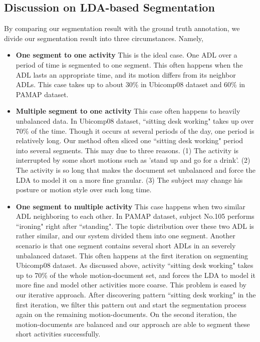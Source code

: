 \documentclass{sigchi}
\begin{document}
    \subsection{Discussion on LDA-based Segmentation}
    By comparing our segmentation result with the ground truth annotation, we divide our segmentation result into three circumstances. Namely,
    \begin{itemize}
        \item \textbf{One segment to one activity}
         This is the ideal case.
         One ADL over a period of time is segmented to one segment.
         This often happens when the ADL lasts an appropriate time, and its motion differs from its neighbor ADLs.
         This case takes up to about 30\% in Ubicomp08 dataset and 60\% in PAMAP dataset.
        \item \textbf{Multiple segment to one activity}
        This case often happens to heavily unbalanced data.
        In Ubicomp08 dataset, ``sitting desk working" takes up over 70\% of the time. Though it occurs at several periods of the day, one period is relatively long. 
        Our method often sliced one ``sitting desk working" period into several segments.
        This may due to three reasons.
        (1) The activity is interrupted by some short motions such as 'stand up and go for a drink'.
        (2) The activity is so long that makes the document set unbalanced and force the LDA to model it on a more fine granular.
        (3) The subject may change his posture or motion style over such long time.
        \item \textbf{One segment to multiple activity}
        This case happens when two similar ADL neighboring to each other.
        In PAMAP dataset, subject No.105 performs ``ironing" right after ``standing".
        The topic distribution over these two ADL is rather similar, and our system divided them into one segment.
        Another scenario is that one segment contains several short ADLs in an severely unbalanced dataset.
        This often happens at the first iteration on segmenting Ubicomp08 dataset.
        As discussed above, activity ``sitting desk working" takes up to 70\% of the whole motion-document set, and forces the LDA to model it more fine and model other activities more coarse.
        This problem is eased by our iterative approach.
        After discovering pattern ``sitting desk working" in the first iteration, we filter this pattern out and start the segmentation process again on the remaining motion-documents.
        On the second iteration, the motion-documents are balanced and our approach are able to segment these short activities successfully.
        
        
    \end{itemize}
\end{document}
